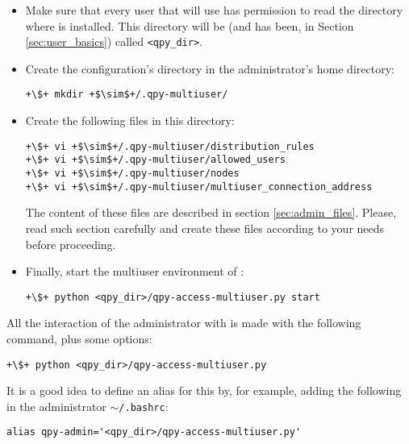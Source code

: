 \documentclass[a4paper,12pt]{article}
\begin{document}
\begin{itemize}
\item Make sure that every user that will use \qpy{} has permission to read the directory where \qpy{} is installed.
This directory will be (and has been, in Section \ref{sec:user_basics}) called \texttt{<qpy\_dir>}.

\item Create the configuration's directory in the administrator's home directory:

\begin{lstlisting}[style=BashStyle]
+\$+ mkdir +$\sim$+/.qpy-multiuser/
\end{lstlisting}

\item Create the following files in this directory:

\begin{lstlisting}[style=BashStyle]
+\$+ vi +$\sim$+/.qpy-multiuser/distribution_rules
+\$+ vi +$\sim$+/.qpy-multiuser/allowed_users
+\$+ vi +$\sim$+/.qpy-multiuser/nodes
+\$+ vi +$\sim$+/.qpy-multiuser/multiuser_connection_address
\end{lstlisting}

The content of these files are described in section \ref{sec:admin_files}.
Please, read such section carefully and create these files according to your needs before proceeding.

\item Finally, start the multiuser environment of \qpy{}:

\begin{lstlisting}[style=BashStyle]
+\$+ python <qpy_dir>/qpy-access-multiuser.py start
\end{lstlisting}

\end{itemize}

All the interaction of the administrator with \qpy{} is made with the following command, plus some options:

\begin{lstlisting}[style=BashStyle]
+\$+ python <qpy_dir>/qpy-access-multiuser.py 
\end{lstlisting}

It is a good idea to define an alias for this by, for example, adding the following in the \qpy{} administrator \texttt{$\sim$/.bashrc}:

\begin{lstlisting}[style=FileStyle]
  alias qpy-admin='<qpy_dir>/qpy-access-multiuser.py'
\end{lstlisting}
\end{document}
